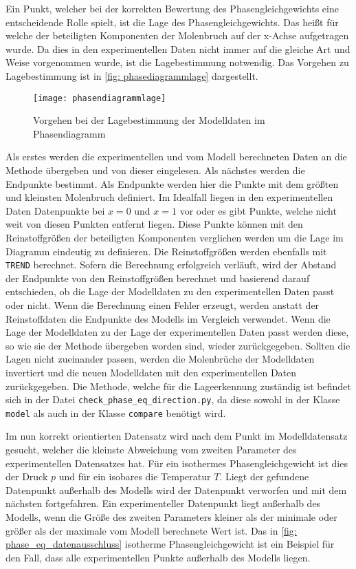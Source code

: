 \documentclass[../thesis.tex]{subfiles}
\begin{document}
Ein Punkt, welcher bei der korrekten Bewertung des Phasengleichgewichts eine entscheidende Rolle spielt, ist die Lage des Phasengleichgewichts. Das heißt für welche der beteiligten Komponenten der Molenbruch auf der x-Achse aufgetragen wurde. Da dies in den experimentellen Daten nicht immer auf die gleiche Art und Weise vorgenommen wurde, ist die Lagebestimmung notwendig. Das Vorgehen zu Lagebestimmung ist in \autoref{fig: phasediagrammlage} dargestellt.

\begin{figure}[htb]
	\centering
	\texttt{[image: phasendiagrammlage]}
	\caption{Vorgehen bei der Lagebestimmung der Modelldaten im Phasendiagramm}
	\label{fig: phasediagrammlage}
\end{figure}

Als erstes werden die experimentellen und vom Modell berechneten Daten an die Methode übergeben und von dieser eingelesen. Als nächstes werden die Endpunkte bestimmt. Als Endpunkte werden hier die Punkte mit dem größten und kleinsten Molenbruch definiert. Im Idealfall liegen in den experimentellen Daten Datenpunkte bei $x = 0$ und $ x = 1$ vor oder es gibt Punkte, welche nicht weit von diesen Punkten entfernt liegen. Diese Punkte können mit den Reinstoffgrößen der beteiligten Komponenten verglichen werden um die Lage im Diagramm eindeutig zu definieren. Die Reinstoffgrößen werden ebenfalls mit \texttt{TREND} berechnet. Sofern die Berechnung erfolgreich verläuft, wird der Abstand der Endpunkte von den Reinstoffgrößen berechnet und basierend darauf entschieden, ob die Lage der  Modelldaten zu den experimentellen Daten passt oder nicht. Wenn die Berechnung einen Fehler erzeugt, werden anstatt der Reinstoffdaten die Endpunkte des Modells im Vergleich verwendet. Wenn die Lage der Modelldaten zu der Lage der experimentellen Daten passt werden diese, so wie sie der Methode übergeben worden sind, wieder zurückgegeben. Sollten die Lagen nicht zueinander passen, werden die Molenbrüche der Modelldaten invertiert und die neuen Modelldaten mit den experimentellen Daten zurückgegeben. Die Methode, welche für die Lageerkennung zuständig ist befindet sich in der Datei \texttt{check\_phase\_eq\_direction.py}, da diese sowohl in der Klasse \texttt{model} als auch in der Klasse \texttt{compare} benötigt wird.

Im nun korrekt orientierten Datensatz wird nach dem Punkt im Modelldatensatz gesucht, welcher die kleinste Abweichung vom zweiten Parameter des experimentellen Datensatzes hat. Für ein isothermes Phasengleichgewicht ist dies der Druck $p$ und für ein isobares die Temperatur $T$. Liegt der gefundene Datenpunkt außerhalb des Modells wird der Datenpunkt verworfen und mit dem nächsten fortgefahren. Ein experimenteller Datenpunkt liegt außerhalb des Modells, wenn die Größe des zweiten Parameters kleiner als der minimale oder größer als der maximale vom Modell berechnete Wert ist. Das in \autoref{fig: phase_eq_datenausschluss} isotherme Phasengleichgewicht ist ein Beispiel für den Fall, dass alle experimentellen Punkte außerhalb des Modells liegen. 
\end{document}
